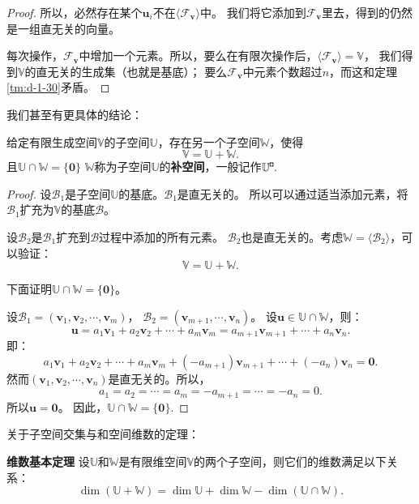 \documentclass[12pt,UTF8]{ctexbook}
\begin{document}
\begin{appendix}
\begin{proof}
    所以，必然存在某个$\mathbf{u}_i$不在$\langle\mathcal{F}_{\mathbf{v}}\rangle$中。
    我们将它添加到$\mathcal{F}_{\mathbf{v}}$里去，得到的仍然是一组直无关的向量。

    每次操作，$\mathcal{F}_{\mathbf{v}}$中增加一个元素。所以，要么在有限次操作后，$\langle\mathcal{F}_{\mathbf{v}}\rangle = \mathbb{V}$，
    我们得到$\mathbb{V}$的直无关的生成集（也就是基底）；
    要么$\mathcal{F}_{\mathbf{v}}$中元素个数超过$n$，而这和定理\ref{tm:d-1-30}矛盾。
\end{proof}

我们甚至有更具体的结论：
\begin{tm}\label{tm:d-1-70}
    给定有限生成空间$\mathbb{V}$的子空间$\mathbb{U}$，存在另一个子空间$\mathbb{W}$，使得
    $$ \mathbb{V} = \mathbb{U} + \mathbb{W}.$$
    且$\mathbb{U} \cap \mathbb{W} = \{\mathbf{0}\}$
    $\mathbb{W}$称为子空间$\mathbb{U}$的\textbf{补空间}，一般记作$\mathbb{U}^{\bu}.$
\end{tm}

\begin{proof}
    设$\mathcal{B}_1$是子空间$\mathbb{U}$的基底。$\mathcal{B}_1$是直无关的。
    所以可以通过适当添加元素，将$\mathcal{B}_1$扩充为$\mathbb{V}$的基底$\mathcal{B}$。

    设$\mathcal{B}_2$是$\mathcal{B}_1$扩充到$\mathcal{B}$过程中添加的所有元素。
    $\mathcal{B}_2$也是直无关的。考虑$\mathbb{W} = \langle\mathcal{B}_2\rangle$，可以验证：
    $$ \mathbb{V} = \mathbb{U} + \mathbb{W}.$$

    下面证明$ \mathbb{U} \cap \mathbb{W} = \{\mathbf{0}\}$。

    设$\mathcal{B}_1 = (\mathbf{v}_1, \mathbf{v}_2, \cdots , \mathbf{v}_m )$，
    $\mathcal{B}_2 = (\mathbf{v}_{m+1}, \cdots , \mathbf{v}_n )$。 
    设$ \mathbf{u} \in \mathbb{U} \cap \mathbb{W}$，则：
    $$ \mathbf{u} = a_1\mathbf{v}_1 + a_2\mathbf{v}_2 + \cdots + a_m\mathbf{v}_m = a_{m+1}\mathbf{v}_{m+1} + \cdots + a_n\mathbf{v}_n. $$
    即：
    $$a_1\mathbf{v}_1 + a_2\mathbf{v}_2 + \cdots + a_m\mathbf{v}_m + (-a_{m+1})\mathbf{v}_{m+1} + \cdots + (-a_{n})\mathbf{v}_{n} = \mathbf{0}. $$
    然而$(\mathbf{v}_1, \mathbf{v}_2, \cdots , \mathbf{v}_n )$是直无关的。所以，
    $$ a_1 = a_2 = \cdots = a_m = -a_{m+1} = \cdots = -a_n = 0.$$
    所以$\mathbf{u} = \mathbf{0}$。
    因此，$ \mathbb{U} \cap \mathbb{W} = \{\mathbf{0}\}$.
\end{proof}

关于子空间交集与和空间维数的定理：
\begin{tm}{\textbf{维数基本定理}}\label{tm:d-1-80}
    设$\mathbb{U}$和$\mathbb{W}$是有限维空间$\mathbb{V}$的两个子空间，则它们的维数满足以下关系：
    $$ \dim (\mathbb{U} + \mathbb{W}) = \dim \mathbb{U} + \dim \mathbb{W} - \dim (\mathbb{U} \cap \mathbb{W}).$$
\end{tm}


\end{appendix}
\end{document}
